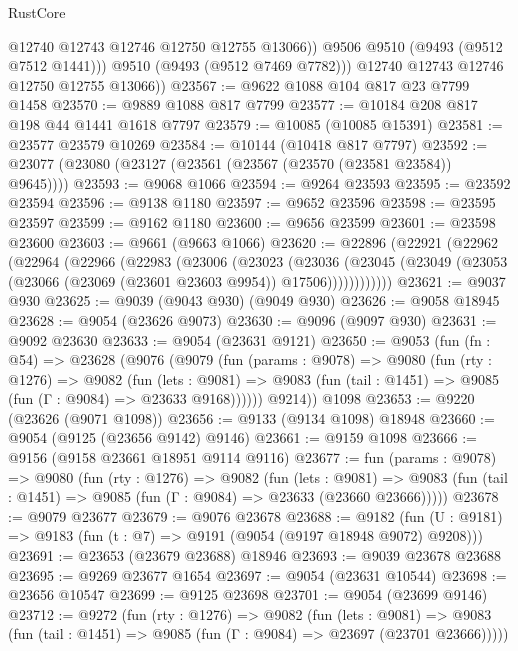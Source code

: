 \begin{lexlean}{RustCore}
\begin{coremodule}
                @12740
                @12743
                @12746
                @12750
                @12755
                @13066))
            @9506
            @9510
            (@9493 (@9512 @7512 @1441)))
          @9510
          (@9493 (@9512 @7469 @7782)))
        @12740
        @12743
        @12746
        @12750
        @12755
        @13066))
@23567 := @9622 @1088 @104 @817 @23 @7799 @1458
@23570 := @9889 @1088 @817 @7799
@23577 := @10184 @208 @817 @198 @44 @1441 @1618 @7797
@23579 := @10085 (@10085 @15391)
@23581 := @23577 @23579 @10269
@23584 := @10144 (@10418 @817 @7797)
@23592 := @23077 (@23080 (@23127 (@23561 (@23567 (@23570 (@23581 @23584)) @9645))))
@23593 := @9068 @1066
@23594 := @9264 @23593
@23595 := @23592 @23594
@23596 := @9138 @1180
@23597 := @9652 @23596
@23598 := @23595 @23597
@23599 := @9162 @1180
@23600 := @9656 @23599
@23601 := @23598 @23600
@23603 := @9661 (@9663 @1066)
@23620 := @22896
    (@22921
      (@22962
        (@22964
          (@22966
            (@22983
              (@23006
                (@23023
                  (@23036
                    (@23045
                      (@23049 (@23053 (@23066 (@23069 (@23601 @23603 @9954)) @17506))))))))))))
@23621 := @9037 @930
@23625 := @9039 (@9043 @930) (@9049 @930)
@23626 := @9058 @18945
@23628 := @9054 (@23626 @9073)
@23630 := @9096 (@9097 @930)
@23631 := @9092 @23630
@23633 := @9054 (@23631 @9121)
@23650 := @9053
    (fun (fn : @54) =>
    @23628
      (@9076
        (@9079
          (fun (params : @9078) =>
          @9080
            (fun (rty : @1276) =>
            @9082
              (fun (lets : @9081) =>
              @9083 (fun (tail : @1451) => @9085 (fun (Γ : @9084) => @23633 @9168))))))
        @9214))
    @1098
@23653 := @9220 (@23626 (@9071 @1098))
@23656 := @9133 (@9134 @1098) @18948
@23660 := @9054 (@9125 (@23656 @9142) @9146)
@23661 := @9159 @1098
@23666 := @9156 (@9158 @23661 @18951 @9114 @9116)
@23677 := fun (params : @9078) =>
  @9080
    (fun (rty : @1276) =>
    @9082
      (fun (lets : @9081) =>
      @9083 (fun (tail : @1451) => @9085 (fun (Γ : @9084) => @23633 (@23660 @23666)))))
@23678 := @9079 @23677
@23679 := @9076 @23678
@23688 := @9182
    (fun (U : @9181) => @9183 (fun (t : @7) => @9191 (@9054 (@9197 @18948 @9072) @9208)))
@23691 := @23653 (@23679 @23688) @18946
@23693 := @9039 @23678 @23688
@23695 := @9269 @23677 @1654
@23697 := @9054 (@23631 @10544)
@23698 := @23656 @10547
@23699 := @9125 @23698
@23701 := @9054 (@23699 @9146)
@23712 := @9272
    (fun (rty : @1276) =>
    @9082
      (fun (lets : @9081) =>
      @9083 (fun (tail : @1451) => @9085 (fun (Γ : @9084) => @23697 (@23701 @23666)))))

\end{coremodule}
\end{lexlean}
